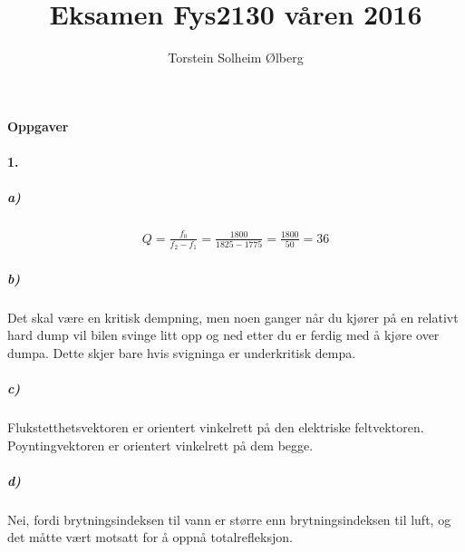 \documentclass[11pt, A4paper,norsk]{article}
\author{Torstein Solheim Ølberg}
\title{Eksamen Fys2130 våren 2016}
\begin{document}
\maketitle
	\begin{center}
\Large \textbf{Oppgaver}
	\end{center}









		\paragraph{1.}
			\subparagraph{a)}
				\begin{gather*}
Q = \frac{f_0}{f_2 - f_1} = \frac{1800}{1825 - 1775} = \frac{1800}{50} = 36
				\end{gather*}









			\subparagraph{b)}
				\begin{flushleft}
Det skal være en kritisk dempning, men noen ganger når du kjører på en relativt hard dump vil bilen svinge litt opp og ned etter du er ferdig med å kjøre over dumpa. Dette skjer bare hvis svigninga er underkritisk dempa.
				\end{flushleft}

			









			\subparagraph{c)}
				\begin{flushleft}
Flukstetthetsvektoren er orientert vinkelrett på den elektriske feltvektoren. Poyntingvektoren er orientert vinkelrett på dem begge.
				\end{flushleft}










			\subparagraph{d)}
				\begin{flushleft}
Nei, fordi brytningsindeksen til vann er større enn brytningsindeksen til luft, og det måtte vært motsatt for å oppnå totalrefleksjon.
				\end{flushleft}
\end{document}
